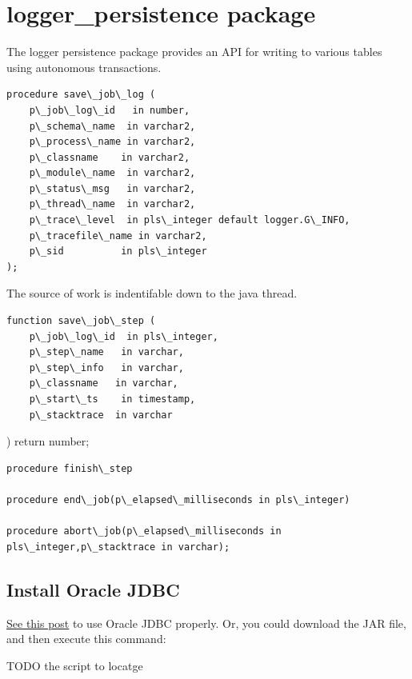 \documentclass[letterpaper,10pt,english]{sphinxmanual}
\begin{document}
\section{logger\_persistence package}
\label{index:logger-persistence-package}
The logger persistence package provides an API for writing to various
tables using autonomous transactions.

\begin{Verbatim}[commandchars=\\\{\}]
procedure save\_job\_log (
    p\_job\_log\_id   in number,
    p\_schema\_name  in varchar2,
    p\_process\_name in varchar2,
    p\_classname    in varchar2,
    p\_module\_name  in varchar2,
    p\_status\_msg   in varchar2,
    p\_thread\_name  in varchar2,
    p\_trace\_level  in pls\_integer default logger.G\_INFO,
    p\_tracefile\_name in varchar2,
    p\_sid          in pls\_integer
);
\end{Verbatim}

The source of work is indentifable down to the java thread.

\begin{Verbatim}[commandchars=\\\{\}]
function save\_job\_step (
    p\_job\_log\_id  in pls\_integer,
    p\_step\_name   in varchar,
    p\_step\_info   in varchar,
    p\_classname   in varchar,
    p\_start\_ts    in timestamp,
    p\_stacktrace  in varchar
\end{Verbatim}

) return number;

\begin{Verbatim}[commandchars=\\\{\}]
procedure finish\_step

procedure end\_job(p\_elapsed\_milliseconds in pls\_integer)

procedure abort\_job(p\_elapsed\_milliseconds in pls\_integer,p\_stacktrace in varchar);
\end{Verbatim}


\subsection{Install Oracle JDBC}
\label{index:install-oracle-jdbc}
\href{https://blogs.oracle.com/dev2dev/get-oracle-jdbc-drivers-and-ucp-from-oracle-maven-repository-without-ides}{See this
post}
to use Oracle JDBC properly. Or, you could download the JAR file, and
then execute this command:

TODO the script to locatge
\end{document}

